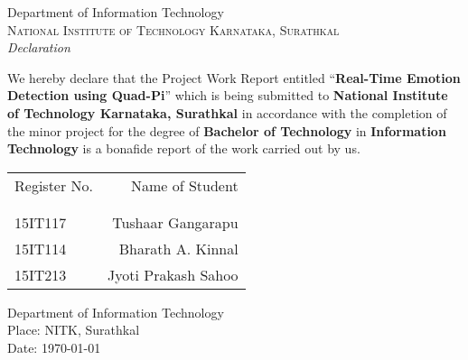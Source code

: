 \newpage
\thispagestyle{empty}

\begin{center}

\huge{Department of Information Technology}\\[0.5cm]
\normalsize
\textsc{National Institute of Technology Karnataka, Surathkal}\\[2.0cm]

\emph{\LARGE Declaration}\\[2cm]
\end{center}
\normalsize We hereby declare that the Project Work Report entitled ``\textbf{Real-Time Emotion Detection using Quad-Pi}'' which is being submitted to {\bf National Institute of Technology Karnataka, Surathkal} in accordance with the completion of the minor project for the degree of {\bf Bachelor of Technology} in {\bf Information Technology} is a bonafide report of the work carried out by us. \\[1.0cm]

\begin{table}[h]
\centering
\bgroup
\def\arraystretch{1.2}
\begin{tabular}{lr}
Register No. & Name of Student \\ \\ \hline
\\
15IT117 & Tushaar Gangarapu \\ 
15IT114 & Bharath A. Kinnal \\
15IT213 & Jyoti Prakash Sahoo \\
\end{tabular}
\egroup
\end{table}

\vfill


\begin{flushleft}
Department of Information Technology \\
Place: NITK, Surathkal \\
Date: \today
\end{flushleft}
